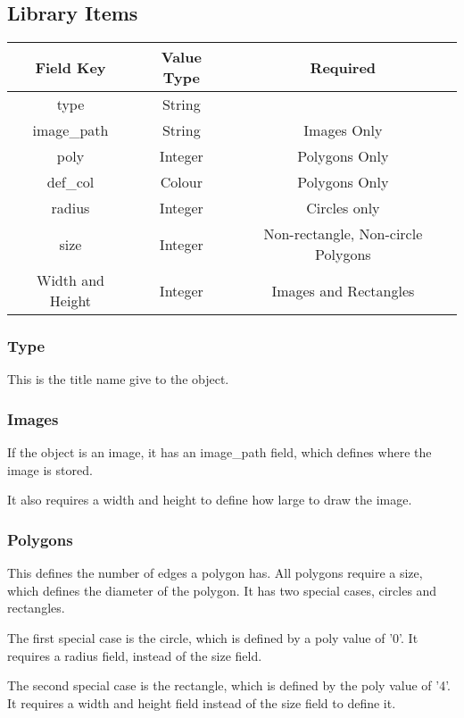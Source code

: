 \documentclass{article}
\begin{document}
	\subsection{Library Items}
	
	\begin{tabular}{|c|c|c|}
		\hline
		\textbf{Field Key} & \textbf{Value Type} & \textbf{Required}\\
		\hline
		type & String & \checkmark\\
		\hline 
		image\_path & String & Images Only\\
		\hline
		poly & Integer & Polygons Only\\
		\hline
		def\_col & Colour & Polygons Only\\
		\hline 
		radius & Integer & Circles only\\
		\hline
		size & Integer & Non-rectangle, Non-circle Polygons\\
		\hline 
		Width and Height & Integer & Images and Rectangles\\
		\hline
	\end{tabular}
	
	\subsubsection*{Type}
	
	This is the title name give to the object.
	
	
	\subsubsection*{Images}
	If the object is an image, it has an image\_path field, which defines where the image is stored.
	
	It also requires a width and height to define how large to draw the image.
	
	\subsubsection*{Polygons}
	This defines the number of edges a polygon has. All polygons require a size, which defines the diameter of the polygon. It has two special cases, circles and rectangles.
	
	The first special case is the circle, which is defined by a poly value of '0'. It requires a radius field, instead of the size field.
	
	The second special case is the rectangle, which is defined by the poly value of '4'. It requires a width and height field instead of the size field to define it.
	
\end{document}
